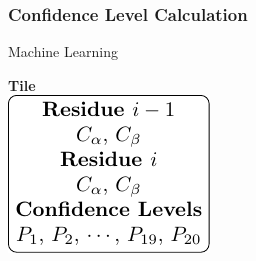 \documentclass{beamer}
\begin{document}
\begin{frame}
	\frametitle{Confidence Level Calculation}
	\begin{minipage}{0.45\textwidth}
		\begin{block}{Machine Learning}
			
		\end{block}
	\end{minipage}
	\begin{minipage}{0.45\textwidth}
	\begin{center}
		\huge\textbf{Tile}\\
		\vspace {12pt}
		\includegraphics[width=\textwidth]{tile_fig}
	\end{center}
	\end{minipage}
\end{frame}
\end{document}
